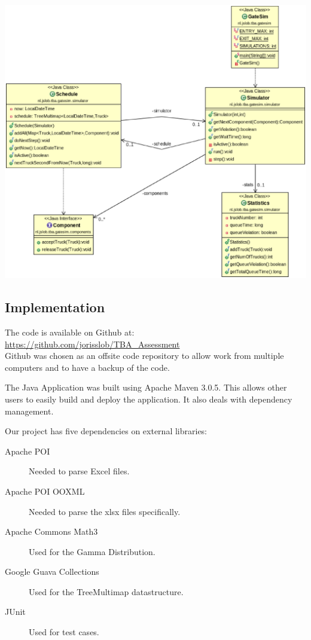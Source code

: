 \documentclass{article}
\begin{document}
\includegraphics[scale=0.4]{Simulator.eps}

\subsection{Implementation}

The code is available on Github at:\\ 
\url{https://github.com/jorisslob/TBA_Assessment}\\ 
Github was chosen as an offsite code repository to allow work from
multiple computers and to have a backup of the code.

The Java Application was built using Apache Maven 3.0.5. This allows
other users to easily build and deploy the application. It also deals
with dependency management.

Our project has five dependencies on external libraries:

\begin{description}
\item[Apache POI] Needed to parse Excel files.
\item[Apache POI OOXML] Needed to parse the xlsx files specifically.
\item[Apache Commons Math3] Used for the Gamma Distribution.
\item[Google Guava Collections] Used for the TreeMultimap datastructure.
\item[JUnit] Used for test cases.
\end{description}
\end{document}
